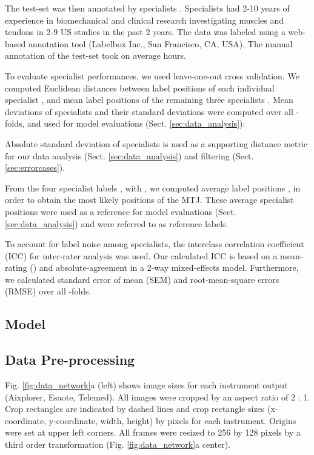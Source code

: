 \documentclass[journal,twoside,web]{ieeecolor}
\begin{document}
The test-set was then annotated by  specialists . Specialists had 2-10 years of experience in biomechanical and clinical research investigating muscles and tendons in 2-9 US studies in the past 2 years. 
The data was labeled using a web-based annotation tool (Labelbox Inc., San Francisco, CA, USA). The manual annotation of the test-set took on average  hours. 

To evaluate specialist performances, we used leave-one-out cross validation. We computed Euclidean distances  between label positions  of each individual specialist , and mean label positions  of the remaining three specialists . 
Mean deviations of specialists  and their standard deviations  were computed over all -folds, and used for model evaluations (Sect. \ref{sec:data_analysis}):

Absolute standard deviation of specialists  is used as a supporting distance metric for our data analysis (Sect. \ref{sec:data_analysis}) and filtering (Sect. \ref{sec:errorcases}). 

From the four specialist labels , with , we computed average label positions , in order to obtain the most likely positions of the MTJ. These average specialist positions were used as a reference for model evaluations (Sect. \ref{sec:data_analysis}) and were referred to as reference labels. 

To account for label noise among specialists, the interclass correlation coefficient (ICC) for inter-rater analysis was used. Our calculated ICC is based on a mean-rating () and absolute-agreement in a 2-way mixed-effects model. Furthermore, we calculated standard error of mean (SEM) and root-mean-square errors (RMSE) over all -folds.



\subsection{Model}
\label{sec:methods.model}

\subsection*{Data Pre-processing}
\label{sec:methods.model.datapre}
Fig. \ref{fig:data_network}a (left) shows image sizes for each instrument output (Aixplorer, Esaote, Telemed). All images were cropped by an aspect ratio of 2 : 1. Crop rectangles are indicated by dashed lines and crop rectangle sizes (x-coordinate, y-coordinate, width, height) by pixels for each instrument. Origins were set at upper left corners. All frames were resized to 256 by 128 pixels by a third order transformation (Fig. \ref{fig:data_network}a center). 
\end{document}
